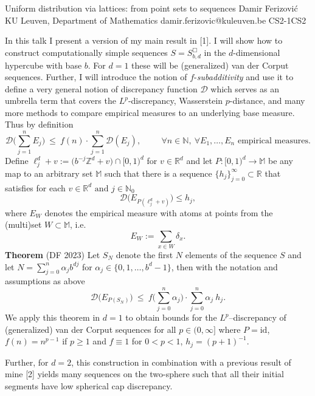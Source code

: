 	\begin{talk}
		{Uniform distribution via lattices: from point sets to sequences}%
		{Damir Ferizovi\'{c}}%
		{KU Leuven, Department of Mathematics}%
		{damir.ferizovic@kuleuven.be}%
		{}%
{}{}{CS2-1}{CS2}

		
		
		In this talk I present a version of my main result in [1]. I will show how to construct computationally simple sequences $S=S^\Box_{b,d}$ in the $d$-dimensional hypercube with base $b$. For $d=1$ these will be (generalized) van der Corput sequences. Further, I will introduce the notion of $f$-\textit{subadditivity}  and use it to define a very general notion of discrepancy function $\mathcal{D}$ which serves as an umbrella term that covers the $L^p$-discrepancy, Wasserstein $p$-distance,  and many more methods to compare empirical measures to an underlying base measure. Thus by definition
		\[
		\mathcal{D}\Big(\sum_{j=1}^{n}E_j\Big)\ \leq\ f(n)\cdot \sum_{j=1}^{n} \mathcal{D}(E_j), \hspace{1cm}\forall n\in\mathbb{N},\ \forall E_1,\ldots,E_n\mbox{ empirical measures}.
		\] 		
		Define $\ell^d_j+v:=\big(b^{-j} \mathbb{Z}^d+v\big)\cap[0,1)^d$ for $v\in\mathbb{R}^d$ and let $P:[0,1)^d\rightarrow \mathbb{M}$ be any map to an arbitrary set $\mathbb{M}$ such that there is a sequence $\{h_j\}_{j=0}^{\infty}\subset \mathbb{R}$ that satisfies  for each $v\in\mathbb{R}^d\mbox{ and }j\in\mathbb{N}_0$
		\[
			\mathcal{D}\big(E_{P(\ell^d_j+v)}\big)\leq h_j, 
		\]
		where  $E_W$ denotes the empirical measure with atoms at points from the (multi)set $W\subset \mathbb{M}$, i.e. 
		\[
			E_W:=\sum_{x\in W} \delta_x.
		\]
		\textbf{Theorem} (DF 2023) Let $S_N$ denote the first $N$ elements of the sequence $S$ and let  $N=\sum_{j=0}^{n}\alpha_j b^{dj}$ for $\alpha_j\in\{0,1,\ldots,b^d-1\}$, then with the notation and assumptions as above
		\[
			\mathcal{D}\big(E_{P(S_N)}\big)\ \leq\ f\Big(\sum_{j=0}^n\alpha_j\Big)\cdot \sum_{j=0}^{n}\alpha_j \ h_j.
		\]
		We apply this theorem in $d=1$ to obtain bounds for the $L^p$--discrepancy of (generalized) van der Corput sequences  for all $p\in(0,\infty]$ where $P=\mathrm{id}$, $f(n)=n^{p-1}$ if $p\geq 1$ and $f\equiv 1$ for $0<p<1$, $h_j=(p+1)^{-1}$. 
		
		Further, for $d=2$, this construction in combination with a previous result of mine [2] yields  many sequences on the two-sphere such that all their initial segments have low  spherical cap discrepancy.
		

\end{talk}
